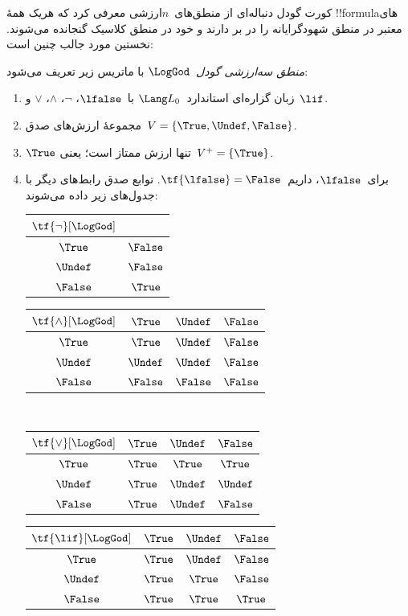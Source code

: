 \documentclass[../../../include/open-logic-section]{subfiles}
\begin{document}


کورت گودل دنباله‌ای از منطق‌های~$n$ارزشی معرفی کرد که هریک همهٔ
!!{formula}های معتبر در منطق شهودگرایانه را در بر دارند و خود در منطق
کلاسیک گنجانده می‌شوند. نخستین مورد جالب چنین است:

\begin{defn}
\emph{منطق سه‌ارزشی گودل}~$\LogGod$ با ماتریس زیر تعریف می‌شود:
\begin{enumerate}
  \item زبان گزاره‌ای استاندارد~$\Lang L_0$ با~$\lfalse$، $\lnot$،
  $\land$، $\lor$ و~$\lif$.
  \item مجموعهٔ ارزش‌های صدق~$V = \{\True, \Undef, \False\}$.
  \item $\True$ تنها ارزش ممتاز است؛ یعنی~$V^+ = \{\True\}$.
  \item برای~$\lfalse$، داریم~$\tf{\lfalse} = \False$. توابع صدق
  رابط‌های دیگر با جدول‌های زیر داده می‌شوند:
  \begin{center}
    \begin{tabular}{c|c} 
      $\tf{\lnot}[\LogGod]$ & \\ 
      \hline  
      $\True$ & $\False$ \\ 
      $\Undef$ & $\False$ \\
      $\False$ & $\True$ 
    \end{tabular}
    \quad
    \begin{tabular}{c|ccc} 
      $\tf{\land}[\LogGod]$ & $\True$ & $\Undef$ & $\False$ \\ 
      \hline 
      $\True$ & $\True$ & $\Undef$ & $\False$ \\ 
      $\Undef$ & $\Undef$ & $\Undef$ & $\False$\\ 
      $\False$ & $\False$ & $\False$ & $\False$ 
    \end{tabular}
    \\[2ex]
    \begin{tabular}{c|ccc} 
      $\tf{\lor}[\LogGod]$ & $\True$ & $\Undef$ & $\False$ \\ 
      \hline 
      $\True$ & $\True$ & $\True$ & $\True$ \\ 
      $\Undef$ & $\True$ & $\Undef$ & $\Undef$ \\
      $\False$ & $\True$ & $\Undef$ & $\False$ 
    \end{tabular}
    \quad
    \begin{tabular}{c|ccc} 
      $\tf{\lif}[\LogGod]$ & $\True$ & $\Undef$ & $\False$ \\ 
      \hline 
      $\True$ & $\True$ & $\Undef$ & $\False$ \\ 
      $\Undef$ & $\True$ & $\True$ & $\False$  \\ 
      $\False$ & $\True$ & $\True$ & $\True$ 
    \end{tabular}
  \end{center} 
\end{enumerate}
\end{defn}
\end{document}
